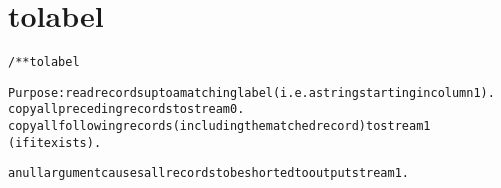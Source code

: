 \section{tolabel}
\begin{shaded}
\begin{alltt}
/** tolabel

  Purpose: read records up to a matching label (i.e. a string starting in column 1).
           copy all preceding records to stream 0.
           copy all following records (including the matched record) to stream 1
             (if it exists).

           a null argument causes all records to be shorted to output stream 1.

\end{alltt}
\end{shaded}
